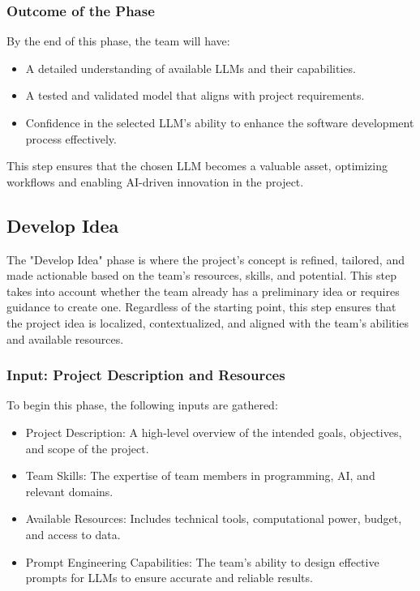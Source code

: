 \documentclass[14pt, a4paper]{article}
\begin{document}
\subsubsection*{Outcome of the Phase}

By the end of this phase, the team will have:

\begin{itemize}
    \item A detailed understanding of available LLMs and their capabilities.
    \item A tested and validated model that aligns with project requirements.
    \item Confidence in the selected LLM’s ability to enhance the software
    development process effectively.
\end{itemize}

This step ensures that the chosen LLM becomes a valuable asset, optimizing
workflows and enabling AI-driven innovation in the project.

\subsection{Develop Idea}

The "Develop Idea" phase is where the project's concept is refined, tailored,
and made actionable based on the team’s resources, skills, and potential. This
step takes into account whether the team already has a preliminary idea or
requires guidance to create one. Regardless of the starting point, this step
ensures that the project idea is localized, contextualized, and aligned with the
team's abilities and available resources.

\subsubsection{Input: Project Description and Resources}

To begin this phase, the following inputs are gathered:

\begin{itemize}
    \item Project Description: A high-level overview of the intended goals,
    objectives, and scope of the project.
    \item Team Skills: The expertise of team members in programming, AI, and
    relevant domains.
    \item Available Resources: Includes technical tools, computational power,
    budget, and access to data.
    \item Prompt Engineering Capabilities: The team's ability to design
    effective prompts for LLMs to ensure accurate and reliable results.
\end{itemize}
\end{document}
